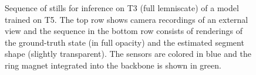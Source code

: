 \begin{figure}[hbt]
  \hfill
  \hfill
  \caption{Sequence of stills for inference on T3 (full lemniscate) of a model trained on T5. The top row shows camera recordings of an external view and the sequence in the bottom row consists of renderings of the ground-truth state (in full opacity) and the estimated segment shape (slightly transparent). The sensors are colored in blue and the ring magnet integrated into the backbone is shown in green.}
  \label{fig:promasens:experiment_sequences}
\end{figure}



